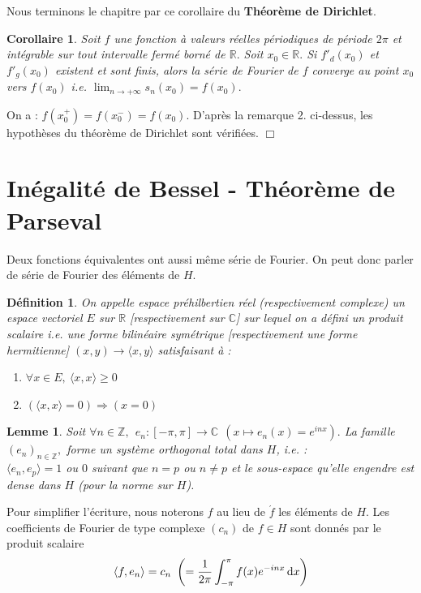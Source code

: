 \documentclass[11pt, a4paper]{book}
\newtheorem{defi}{D\'efinition}[section]
\newtheorem{cor}{Corollaire}[section]
\newtheorem{lem}{Lemme}[section]
\newenvironment{pr}{\noindent {\bf Preuve} \noindent} {\hfill $\Box$\vskip 5mm}
\begin{document}
Nous terminons le chapitre par ce corollaire du \textbf{Th\'eor\`eme de Dirichlet}.
\begin{cor}\label{cor7.2.1} Soit $f$ une fonction \`a valeurs r\'eelles p\'eriodiques de p\'eriode $2\pi$ et int\'egrable sur tout intervalle ferm\'e born\'e de $\mathbb{R}.$ Soit $x_0\in \mathbb{R}.$ Si $f'_d(x_0)$ et $f'_g(x_0)$ existent et sont finis, alors la s\'erie de Fourier de $f$ converge au point $x_0$ vers $f(x_0)$ i.e. ${\displaystyle \lim_{n\to+\infty}s_n(x_0)=f(x_0)}.$
\end{cor}
\begin{pr}\quad On a : $f(x_0^+)=f(x_0^-)=f(x_0).$ D'apr\`es la remarque 2. ci-dessus, les hypoth\`eses du th\'eor\`eme de Dirichlet sont v\'erifi\'ees.
\end{pr}

\section{In\'egalit\'e de Bessel - Th\'eor\`eme de Parseval}
Deux fonctions \'equivalentes ont aussi m\^eme s\'erie de Fourier. On peut donc parler de s\'erie de Fourier des \'el\'ements de $H$.
\begin{defi} On appelle espace pr\'ehilbertien r\'eel (respectivement complexe) un espace vectoriel $E$ sur $\mathbb{R}$ [respectivement sur $\mathbb{C}$] sur lequel on a d\'efini un produit scalaire i.e. une forme bilin\'eaire sym\'etrique [respectivement une forme hermitienne] $(x,y)\to\langle x,y\rangle$ satisfaisant \`a :
\begin{enumerate}
\item $\forall x\in E,~\langle x,x\rangle\geq 0$ 
\item $(\langle x,x\rangle=0)\Rightarrow(x=0)$
\end{enumerate}
\end{defi}
\begin{lem} \label{lem7.3.1} Soit $\forall n\in \mathbb{Z},~~e_n:[-\pi,\pi]\to\mathbb{C}~~(x\mapsto e_n(x)=e^{inx}).$ La famille $(e_n)_{n\in \mathbb{Z}},$ forme un syst\`eme orthogonal total dans $H$, i.e. : \\ $\langle e_n,e_p\rangle=1$ ou $0$ suivant que $n=p$ ou $n\neq p$ et le sous-espace qu'elle engendre est dense dans $H$ (pour la norme sur $H$).
\end{lem}
Pour simplifier l'\'ecriture, nous noterons $f$ au lieu de $\acute{f}$ les \'el\'ements de $H$. Les coefficients de Fourier de type complexe $(c_n)$ de $f\in H$ sont donn\'es par le produit scalaire $$\langle f,e_n\rangle=c_n~\left(=\dfrac{1}{2\pi}\int_{-\pi}^\pi f(x)e^{-inx}\,\mathrm{d} x\right)$$
\end{document}
